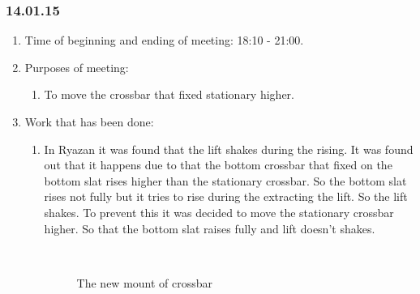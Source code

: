 \subsubsection{14.01.15}
\begin{enumerate}
	
	\item Time of beginning and ending of meeting: 18:10 - 21:00.
	
	\item Purposes of meeting: 
	\begin{enumerate}
		
		\item To move the crossbar that fixed stationary higher.
		
	\end{enumerate}

	\item Work that has been done:
	\begin{enumerate}
		
		\item In Ryazan it was found that the lift shakes during the rising. It was found out that it happens due to that the bottom crossbar that fixed on the bottom slat rises higher than the stationary crossbar. So the bottom slat rises not fully but it tries to rise during the extracting the lift. So the lift shakes. To prevent this it was decided to move the stationary crossbar higher. So that the bottom slat raises fully and lift doesn't shakes.
        \begin{figure}[H]
	  	  \begin{minipage}[h]{0.2\linewidth}
	  	    \center  
	  	  \end{minipage}
	  	  \begin{minipage}[h]{0.6\linewidth}
	  		\caption{The new mount of crossbar}
	  	  \end{minipage}
	   \end{figure}


\end{enumerate}
\end{enumerate}
